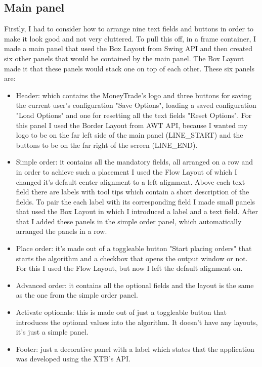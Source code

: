 \documentclass[12pt,a4paper]{report}
\begin{document}
\subsection{Main panel}
Firstly, I had to consider how to arrange nine text fields and buttons in order to make it look good and not very cluttered. To pull this off, in a frame container, I made a main panel that used the Box Layout from Swing API and then created six other panels that would be contained by the main panel. The Box Layout made it that these panels would stack one on top of each other. These six panels are:
\begin{itemize}
 	\item Header: which contains the MoneyTrade's logo and three buttons for saving the current user's configuration "Save Options", loading a saved configuration "Load Options" and one for resetting all the text fields "Reset Options". For this panel I used the Border Layout from AWT API, because I wanted my logo to be on the far left side of the main panel (LINE\_START) and the buttons to be on the far right of the screen (LINE\_END).   
 	\item Simple order: it contains all the mandatory fields, all arranged on a row and in order to achieve such a placement I used the Flow Layout of which I changed it's default center alignment to a left alignment. Above each text field there are labels with tool tips which contain a short description of the fields. To pair the each label with its corresponding field I made small panels that used the Box Layout in which I introduced a label and a text field. After that I added these panels in the simple order panel, which automatically arranged the panels in a row.    
 	\item Place order: it's made out of a toggleable button "Start placing orders" that starts the algorithm and a checkbox that opens the output window or not. For this I used the Flow Layout, but now I left the default alignment on.  
 	\item Advanced order: it contains all the optional fields and the layout is the same as the one from the simple order panel.
 	\item Activate optionals: this is made out of just a toggleable button that introduces the optional values into the algorithm. It doesn't have any layouts, it's just a simple panel.
 	\item Footer: just a decorative panel with a label which states that the application was developed using the XTB's API. 
\end{itemize}
\end{document}
